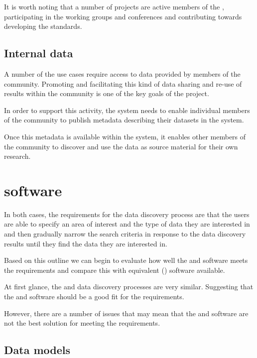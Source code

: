 \documentclass{article}
\begin{document}
It is worth noting that a number of \cite{nasa} projects are active members
of the \cite{ivoa}, participating in the working groups and conferences
and contributing towards developing the \cite{ivoa} standards.

\subsection{Internal data}

A number of the \cite{trop} use cases require access to data provided by
members of the \cite{trop} community. Promoting and facilitating this kind
of data sharing and re-use of results within the \cite{trop} community is
one of the key goals of the \cite{trop} project.

In order to support this activity, the \cite{trop} system needs to enable
individual members of the \cite{trop} community to publish metadata describing
their datasets in the \cite{trop} system.

Once this metadata is available within the \cite{trop} system, it enables
other members of the \cite{trop} community to discover and use the data as
source material for their own research.

\section{\cite{ivoa} software}

In both cases, the requirements for the data discovery process are that the
users are able to specify an area of interest and the type of data they are
interested in and then gradually narrow the search criteria in response to
the data discovery results until they find the data they are interested in.

Based on this outline we can begin to evaluate how well the \cite{ivoa}
and \cite{astro} software meets the \cite{trop} requirements and compare
this with equivalent  (\cite{gis}) software available.

At first glance, the \cite{ivoa} and \cite{trop} data discovery processes
are very similar. Suggesting that the \cite{ivoa} and \cite{astro} software
should be a good fit for the \cite{trop} requirements.

However, there are a number of issues that may mean that the \cite{ivoa} and
\cite{astro} software are not the best solution for meeting the \cite{trop}
requirements.

\subsection{Data models}
\end{document}
